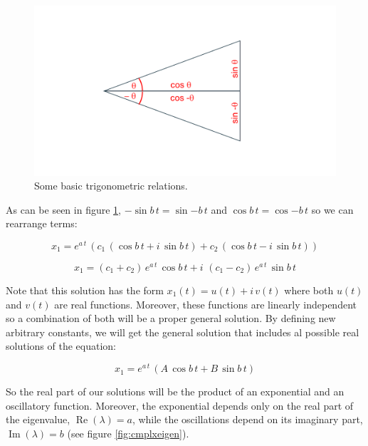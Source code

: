 \documentclass{tufte-book} %
\begin{document}
\begin{figure}
\begin{center}
	\includegraphics[width=\textwidth]{trigo}
\end{center}
\caption{Some basic trigonometric relations.}
\label{fig:trigo}
\end{figure}

As can be seen in  figure \ref{fig:trigo}, $- \sin{b \, t}=\sin{- b \, t}$ and $\cos{b \, t}=\cos{ - b \, t}$ so we can rearrange terms:

\begin{equation}
	x_1= e^{a \, t} \,  \left( c_1  \, \left(  \cos{ b \, t} + i \, \sin{ b \, t} \right)+ c_2 \, \left( \cos{ b \, t} - i \, \sin{ b \, t} \right) \right) \nonumber
\end{equation}


\begin{equation}
	x_1=   \left( c_1+c_2\right) \, e^{a \, t} \, \cos{ b \, t}  + i \, \,\left( c_1-c_2 \right) \,e^{a \, t} \,   \sin{ b \, t}   \nonumber
\end{equation}

Note that this solution has the form $x_1(t) = u(t) + i \, v(t)$ where both $u(t)$ and $v(t)$ are real functions. Moreover, these functions are linearly independent so a combination of both will be a proper general solution. By defining new arbitrary constants, we will get the general solution that includes al possible real solutions of the equation:

\begin{equation}
	x_1=   e^{a \, t} \,  \left(  A  \, \cos{ b \, t}  +  B  \,   \sin{ b \, t}  \right) \nonumber
\end{equation}

So the real part of our solutions will be the product of an exponential and an oscillatory function. Moreover, the exponential depends only on the real part of the eigenvalue, $\operatorname{Re}(\lambda) = a$, while the oscillations depend on its imaginary part,  $\operatorname{Im}(\lambda) =b$ (see figure \ref{fig:cmplxeigen}). 
\end{document}

